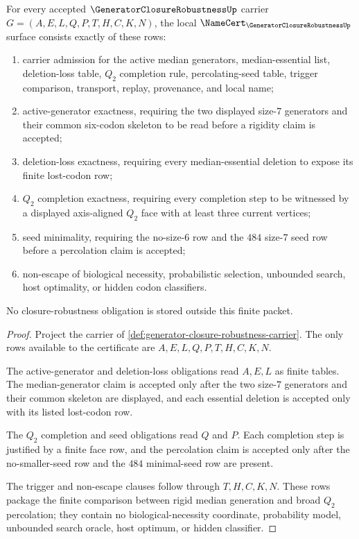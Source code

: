 \begin{theorem}
\label{thm:generator-closure-robustness-namecert-obligations}
For every accepted $\GeneratorClosureRobustnessUp$ carrier $G=(A,E,L,Q,P,T,H,C,K,N)$, the local $\NameCert_{\GeneratorClosureRobustnessUp}$ surface consists exactly of these rows:
\begin{enumerate}
\item carrier admission for the active median generators, median-essential list, deletion-loss table, $Q_{2}$ completion rule, percolating-seed table, trigger comparison, transport, replay, provenance, and local name;
\item active-generator exactness, requiring the two displayed size-$7$ generators and their common six-codon skeleton to be read before a rigidity claim is accepted;
\item deletion-loss exactness, requiring every median-essential deletion to expose its finite lost-codon row;
\item $Q_{2}$ completion exactness, requiring every completion step to be witnessed by a displayed axis-aligned $Q_{2}$ face with at least three current vertices;
\item seed minimality, requiring the no-size-$6$ row and the $484$ size-$7$ seed row before a percolation claim is accepted;
\item non-escape of biological necessity, probabilistic selection, unbounded search, host optimality, or hidden codon classifiers.
\end{enumerate}
No closure-robustness obligation is stored outside this finite packet.
\end{theorem}
\begin{proof}
Project the carrier of \autoref{def:generator-closure-robustness-carrier}. The only rows available to the certificate are $A,E,L,Q,P,T,H,C,K,N$.

The active-generator and deletion-loss obligations read $A,E,L$ as finite tables. The median-generator claim is accepted only after the two size-$7$ generators and their common skeleton are displayed, and each essential deletion is accepted only with its listed lost-codon row.

The $Q_{2}$ completion and seed obligations read $Q$ and $P$. Each completion step is justified by a finite face row, and the percolation claim is accepted only after the no-smaller-seed row and the $484$ minimal-seed row are present.

The trigger and non-escape clauses follow through $T,H,C,K,N$. These rows package the finite comparison between rigid median generation and broad $Q_{2}$ percolation; they contain no biological-necessity coordinate, probability model, unbounded search oracle, host optimum, or hidden classifier.
\end{proof}

